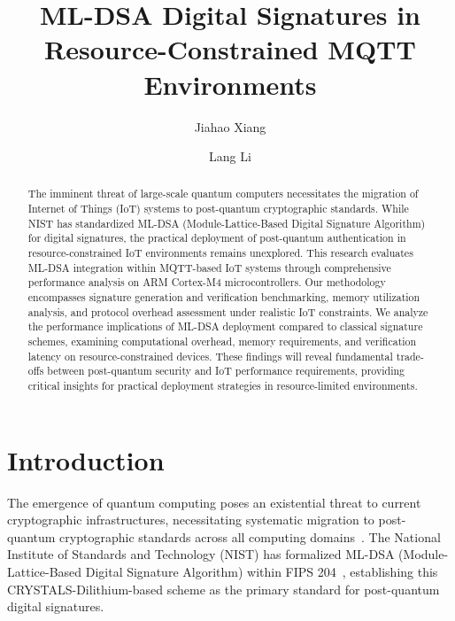 \documentclass[journal=tches,final]{iacrtrans}
\author{Jiahao Xiang\inst{1} \and Lang Li\inst{1}}
\institute{
  Hengyang Normal University, College of Computer Science and Technology, Hengyang, China
}
\title[ML-DSA Digital Signatures in Resource-Constrained MQTT Environments]{ML-DSA Digital Signatures in Resource-Constrained MQTT Environments}
\begin{document}
\maketitle


\begin{abstract}
  The imminent threat of large-scale quantum computers necessitates the migration of Internet of Things (IoT) systems to post-quantum cryptographic standards. While NIST has standardized ML-DSA (Module-Lattice-Based Digital Signature Algorithm) for digital signatures, the practical deployment of post-quantum authentication in resource-constrained IoT environments remains unexplored. This research evaluates ML-DSA integration within MQTT-based IoT systems through comprehensive performance analysis on ARM Cortex-M4 microcontrollers. Our methodology encompasses signature generation and verification benchmarking, memory utilization analysis, and protocol overhead assessment under realistic IoT constraints. We analyze the performance implications of ML-DSA deployment compared to classical signature schemes, examining computational overhead, memory requirements, and verification latency on resource-constrained devices. These findings will reveal fundamental trade-offs between post-quantum security and IoT performance requirements, providing critical insights for practical deployment strategies in resource-limited environments.
\end{abstract}

\section{Introduction}

{\color{blue}The emergence of quantum computing poses an existential threat to current cryptographic infrastructures, necessitating systematic migration to post-quantum cryptographic standards across all computing domains~\cite{Khalid2019}.} The National Institute of Standards and Technology (NIST) has formalized ML-DSA (Module-Lattice-Based Digital Signature Algorithm) within FIPS 204~\cite{NIST-FIPS-204}, establishing this CRYSTALS-Dilithium-based scheme as the primary standard for post-quantum digital signatures.
\end{document}
